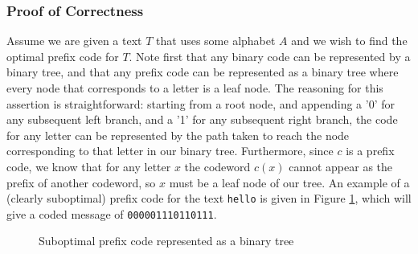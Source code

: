 \documentclass[paper=a4, fontsize=10pt]{article} %
\numberwithin{equation}{section} %
\numberwithin{figure}{section} %
\numberwithin{table}{section} %
\begin{document}
\pagebreak

\subsubsection{Proof of Correctness}

Assume we are given a text $T$ that uses some alphabet $A$ and we wish to find the optimal prefix code for $T$. Note first that any binary code can be represented by a binary tree, and that any prefix code can be represented as a binary tree where every node that corresponds to a letter is a leaf node. The reasoning for this assertion is straightforward: starting from a root node, and appending a '0' for any subsequent left branch, and a '1' for any subsequent right branch, the code for any letter can be represented by the path taken to reach the node corresponding to that letter in our binary tree. Furthermore, since $c$ is a prefix code, we know that for any letter $x$ the codeword $c(x)$ cannot appear as the prefix of another codeword, so $x$ must be a leaf node of our tree. An example of a (clearly suboptimal) prefix code for the text \texttt{hello} is given in Figure \ref{fig:subopt}, which will give a coded message of \texttt{000001110110111}.

\begin{figure}[h]
\centering


\caption{Suboptimal prefix code represented as a binary tree} \label{fig:subopt}
\end{figure}
\end{document}
